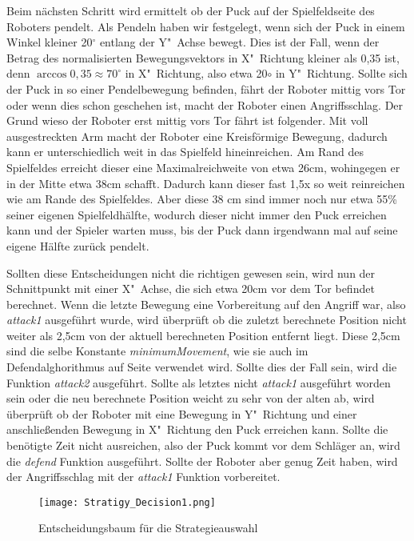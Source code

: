 Beim nächsten Schritt wird ermittelt ob der Puck auf der Spielfeldseite des Roboters pendelt. Als Pendeln haben wir festgelegt, wenn sich der Puck in einem Winkel kleiner 20$^\circ$ entlang der Y"~Achse bewegt. Dies ist der Fall, wenn der Betrag des normalisierten Bewegungsvektors in X"~Richtung kleiner als 0,35 ist, denn $\arccos 0,35 \approx 70^\circ$ in X"~Richtung, also etwa 20$\circ$ in Y"~Richtung. Sollte sich der Puck in so einer Pendelbewegung befinden, fährt der Roboter mittig vors Tor oder wenn dies schon geschehen ist, macht der Roboter einen Angriffsschlag. Der Grund wieso der Roboter erst mittig vors Tor fährt ist folgender. Mit voll ausgestreckten Arm macht der Roboter eine Kreisförmige Bewegung, dadurch kann er unterschiedlich weit in das Spielfeld hineinreichen. Am Rand des Spielfeldes erreicht dieser eine Maximalreichweite von etwa 26cm, wohingegen er in der Mitte etwa 38cm schafft. Dadurch kann dieser fast 1,5x so weit reinreichen wie am Rande des Spielfeldes.
Aber diese 38 cm sind immer noch nur etwa 55\% seiner eigenen Spielfeldhälfte, wodurch dieser nicht immer den Puck erreichen kann und der Spieler warten muss, bis der Puck dann irgendwann mal auf seine eigene Hälfte zurück pendelt.

Sollten diese Entscheidungen nicht die richtigen gewesen sein, wird nun der Schnittpunkt mit einer X"~Achse, die sich etwa 20cm vor dem Tor befindet berechnet. Wenn die letzte Bewegung eine Vorbereitung auf den Angriff war, also \textit{attack1} ausgeführt wurde, wird überprüft ob die zuletzt berechnete Position nicht weiter als 2,5cm von der aktuell berechneten Position entfernt liegt. Diese 2,5cm sind die selbe Konstante \textit{minimumMovement}, wie sie auch im Defendalghorithmus auf Seite \pageref{lst:defensivstrategie} verwendet wird. Sollte dies der Fall sein, wird die Funktion \textit{attack2} ausgeführt. Sollte als letztes nicht \textit{attack1} ausgeführt worden sein oder die neu berechnete Position weicht zu sehr von der alten ab, wird überprüft ob der Roboter mit eine Bewegung in Y"~Richtung und einer anschließenden Bewegung in X"~Richtung den Puck erreichen kann. Sollte die benötigte Zeit nicht ausreichen, also der Puck kommt vor dem Schläger an, wird die \textit{defend} Funktion ausgeführt. Sollte der Roboter aber genug Zeit haben, wird der Angriffsschlag mit der \textit{attack1} Funktion vorbereitet.

\begin{figure}[htbp]
	\texttt{[image: Stratigy\_Decision1.png]}
	\caption{Entscheidungsbaum für die Strategieauswahl}
	\label{img:Entscheidungsbaum Strategieauswahl}
\end{figure}